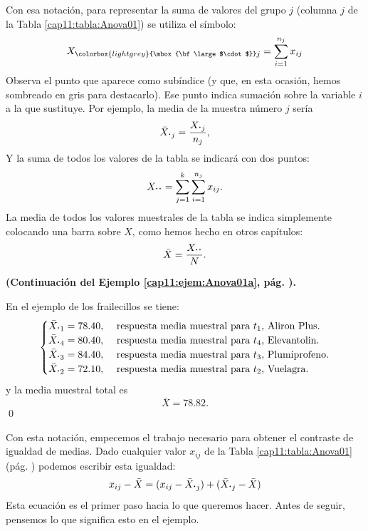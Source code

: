 Con esa notación, para representar la suma de valores del grupo $j$ (columna $j$ de la Tabla \ref{cap11:tabla:Anova01}) se utiliza el símbolo:
        \[X_{\colorbox{lightgrey}{\mbox{\bf\large$\cdot$}}j}=\sum_{i=1}^{n_j}x_{ij}\]
Observa el punto que aparece como subíndice (y que, en esta ocasión, hemos sombreado en gris para destacarlo). Ese punto indica sumación sobre la variable $i$ a la que sustituye. Por ejemplo, la media de la muestra número $j$ sería
          \[
          \bar X_{{\mbox{\bf\large$\cdot$}}j}	=
          \dfrac{X_{{\mbox{\bf\large $\cdot$}}j}}{n_j},
          \]
Y la suma de todos los valores de la tabla se indicará con dos puntos:
    \[X_{{\mbox{\bf\large $\cdot\cdot$}}}=\sum_{j=1}^k\sum_{i=1}^{n_j}x_{ij}.\]
La media de todos los valores muestrales de la tabla se indica simplemente colocando una barra sobre $X$, como hemos hecho en otros capítulos:
    \[\bar{X}=\dfrac{X_{{\mbox{\bf\large $\cdot\cdot$}}}}{N}.\]

\begin{ejemplo}{\bf (Continuación del Ejemplo \ref{cap11:ejem:Anova01a}, pág. \pageref{cap11:ejem:Anova01a}).}
\label{cap11:ejem:FrailecillosCalculoMediasGrupos}

 En el ejemplo de los frailecillos se tiene:
\[
\begin{cases}
\bar X_{{\mbox{\bf\large$\cdot$}}1}=78.40,&
\mbox{ respuesta media muestral para $t_1$, {Aliron Plus}}.\\
\bar X_{{\mbox{\bf\large$\cdot$}}4}=80.40,&
\mbox{ respuesta media  muestral para $t_4$, {Elevantolin}}.\\
\bar X_{{\mbox{\bf\large$\cdot$}}3}=84.40,&
\mbox{ respuesta media  muestral para $t_3$, {Plumiprofeno}}.\\
\bar X_{{\mbox{\bf\large$\cdot$}}2}=72.10,&
\mbox{ respuesta media muestral  para $t_2$, {Vuelagra}}.

\end{cases}
\]
y la media muestral total es
\[\bar{X}=78.82.\]
\qed
\end{ejemplo}

Con esta notación, empecemos el trabajo necesario para obtener el contraste de igualdad de medias. Dado cualquier valor $x_{ij}$ de la Tabla \ref{cap11:tabla:Anova01} (pág. \pageref{cap11:tabla:Anova01}) podemos escribir esta igualdad:
    \begin{equation}
    \label{cap11:ecu:AnovaIdentidadEstimadores}
        x_{ij}-\bar X=
        (x_{ij}-\bar X_{\mbox{\bf\large $\cdot$}j})+
        (\bar X_{\mbox{\bf\large$\cdot$}j}-\bar X)
    \end{equation}
Esta ecuación es el primer paso hacia lo que queremos hacer. Antes de seguir, pensemos lo que significa esto en el ejemplo.

